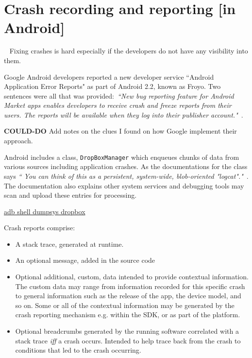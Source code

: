 \chapter{Crash recording and reporting [in Android]}~\label{app:crash-recording-and-reporting-in-android}
Fixing crashes is hard especially if the developers do not have any visibility into them. 


Google Android developers reported a new developer service ``Android Application Error Reports" as part of Android 2.2, known as Froyo. Two sentences were all that was provided:~\emph{``New bug reporting feature for Android Market apps enables developers to receive crash and freeze reports from their users. The reports will be available when they log into their publisher account."}~\citep{android2010_froyo_highlights_new_developer_services}.

\textbf{COULD-DO} Add notes on the clues I found on how Google implement their approach.

Android includes a class, \texttt{DropBoxManager} which enqueues chunks of data from various sources including application crashes. As the documentations for the class says \emph{`` You can think of this as a persistent, system-wide, blob-oriented "logcat"."}~\citep{android_dropboxmanager}. The documentation also explains other system services and debugging tools may scan and upload these entries for processing.


\href{https://github.com/operando/Android-Command-Note}{adb shell dumpsys dropbox}

Crash reports comprise:
\begin{itemize}
    \item A stack trace, generated at runtime. %
    \item An optional message, added in the source code
    \item Optional additional, custom, data intended to provide contextual information. The custom data may range from information recorded for this specific crash to general information such as the release of the app, the device model, and so on. Some or all of the contextual information may be generated by the crash reporting mechanism e.g. within the SDK, or as part of the platform.
    \item Optional breadcrumbs generated by the running software correlated with a stack trace \emph{iff} a crash occurs. Intended to help trace back from the crash to conditions that led to the crash occurring. 
\end{itemize}

